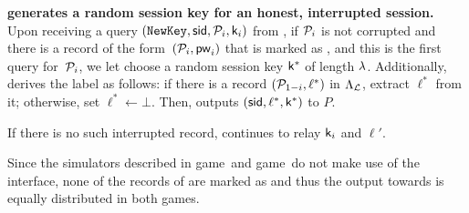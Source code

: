 \begin{games}
\textbf{\Func generates a random session key for an honest, interrupted session.}
Upon receiving a query $(\texttt{NewKey},\mathsf{sid},\mathcal{P}_{i},\mathsf{k}_{i})$ from \Sim, if $\mathcal{P}_{i}$ is not corrupted and there is a record of the form~$(\mathcal{P}_{i},\mathsf{pw}_{i})$ that is marked as , and this is the first \NewKey query for~$\mathcal{P}_{i}$, we let \Func choose a random session key $\mathsf{k}^*$ of length $\lambda$. Additionally, \Func derives the label as follows: if there is a record $(\mathcal{P}_{1-i},\ell^*)$ in $\Lambda_{\mathcal{L}}$, extract $\ell^*$ from it; otherwise, set $\ell^*\gets\bot$. Then, \Func outputs $(\mathsf{sid},\ell^*,\mathsf{k}^*)$ to $P$.

If there is no such interrupted record, \Func continues to relay $\mathsf{k}_{i}$ and $\ell'$.

Since the simulators described in game~\previousgame and game~\thisgame do not make use of the \TestPwd interface, none of the records of \Func are marked as  and thus the output towards \Env is equally distributed in both games.


\end{games}
